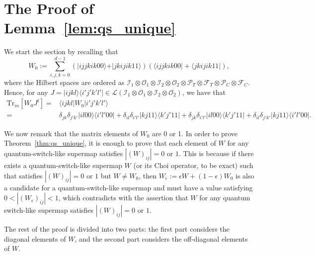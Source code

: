 \documentclass[a4paper,twocolumn,accepted=2022-10-23]{quantumarticle}
\newcommand{\bra}[1]{\langle {#1} \vert}
\newcommand{\ket}[1]{\vert {#1} \rangle}
\newcommand{\ketbra}[2]{\vert {#1} \rangle\!\langle {#2} \vert}
\newcommand{\Tr}[0]{{\mathrm{Tr}}}
\newcommand{\fcal}[0]{{\mathcal{F}}}
\newcommand{\ical}[0]{{\mathcal{I}}}
\newcommand{\ocal}[0]{{\mathcal{O}}}
\newcommand{\pcal}[0]{{\mathcal{P}}}
\newcommand{\lcal}[0]{{\mathcal{L}}}
\theoremstyle{definition}
\begin{document}
\section{The Proof of Lemma~\ref{lem:qs_unique}}\label{ap:proof_qs}



We start the section by recalling that
\begin{equation}
\displaystyle{W_0:= \sum_{i,j,k=0}^{d-1} ( \ket{ijjkik00} + \ket{jkijik11} )( \bra{ijjkik00} + \bra{jkijik11} )},
\end{equation}
where the Hilbert spaces are ordered as $\ical_1 \otimes \ocal_1 \otimes \ical_2 \otimes \ocal_2 \otimes \pcal_T  \otimes \fcal_T \otimes \pcal_C \otimes \fcal_C$. Hence, for any $J = \ketbra{ijkl}{i'j'k'l'} \in \lcal( \ical_1 \otimes \ocal_1 \otimes \ical_2 \otimes \ocal_2)$, we have that
\begin{align}
\Tr_{in} [W_0 J^t] =& \bra{ijkl} W_0 \ket{i'j'k'l'}  \\
=& \delta_{jk}\delta_{j'k'} \ketbra{il00}{i'l'00} + \delta_{il}\delta_{i'l'} \ketbra{kj11}{k'j'11}
 + \delta_{jk}\delta_{i'l'} \ketbra{il00}{k'j'11} + \delta_{il}\delta_{j'k'} \ketbra{kj11}{i'l'00}. \label{eq:qs_action_cbasis}
\end{align}


We now remark that the matrix elements of $W_0$ are 0 or 1.
In order to prove Theorem~\ref{thm:qs_unique}, it is enough to prove that each element of $W$ for any quantum-switch-like supermap satisfies $| (W)_{ij} | = 0 \mbox{ or } 1$.
This is because if there exists a quantum-switch-like supermap $W$ (or its Choi operator, to be exact) such that satisfies $| (W)_{ij} | = 0 \mbox{ or } 1$ but $W \neq W_0$,
then $W_\epsilon := \epsilon W + (1-\epsilon) W_0$ is also a candidate for a quantum-switch-like supermap and must have a value satisfying $0 < | (W_{\epsilon})_{ij} | < 1$,
which contradicts with the assertion that $W$ for any quantum switch-like supermap satisfies $| (W)_{ij} | = 0 \mbox{ or } 1$.


The rest of the proof is divided into two parts:
the first part considers the diagonal elements of $W$, and the second part considers the off-diagonal elements of $W$.
\end{document}
